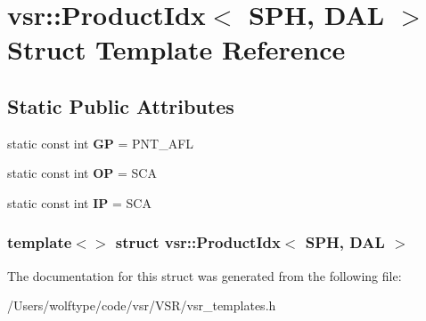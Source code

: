 \hypertarget{structvsr_1_1_product_idx_3_01_s_p_h_00_01_d_a_l_01_4}{\section{vsr\-:\-:Product\-Idx$<$ S\-P\-H, D\-A\-L $>$ Struct Template Reference}
\label{structvsr_1_1_product_idx_3_01_s_p_h_00_01_d_a_l_01_4}
}
\subsection*{Static Public Attributes}
\begin{DoxyCompactItemize}
\item 
\hypertarget{structvsr_1_1_product_idx_3_01_s_p_h_00_01_d_a_l_01_4_a28b6bdb891c1325e8059a7b0a5b3c543}{static const int {\bfseries G\-P} = P\-N\-T\-\_\-\-A\-F\-L}\label{structvsr_1_1_product_idx_3_01_s_p_h_00_01_d_a_l_01_4_a28b6bdb891c1325e8059a7b0a5b3c543}

\item 
\hypertarget{structvsr_1_1_product_idx_3_01_s_p_h_00_01_d_a_l_01_4_a8d64d432ab74fd92a4af004a968a8206}{static const int {\bfseries O\-P} = S\-C\-A}\label{structvsr_1_1_product_idx_3_01_s_p_h_00_01_d_a_l_01_4_a8d64d432ab74fd92a4af004a968a8206}

\item 
\hypertarget{structvsr_1_1_product_idx_3_01_s_p_h_00_01_d_a_l_01_4_a1c97fdea3082550e67e71beaf6aacd53}{static const int {\bfseries I\-P} = S\-C\-A}\label{structvsr_1_1_product_idx_3_01_s_p_h_00_01_d_a_l_01_4_a1c97fdea3082550e67e71beaf6aacd53}

\end{DoxyCompactItemize}
\subsubsection*{template$<$$>$ struct vsr\-::\-Product\-Idx$<$ S\-P\-H, D\-A\-L $>$}



The documentation for this struct was generated from the following file\-:\begin{DoxyCompactItemize}
\item 
/\-Users/wolftype/code/vsr/\-V\-S\-R/vsr\-\_\-templates.\-h\end{DoxyCompactItemize}
